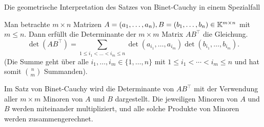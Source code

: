 Die geometrische Interpretation des Satzes von Binet-Cauchy in einem Spezialfall  

\begin{thm}
	Man betrachte $m \times n$ Matrizen $ A = (a_1, \ldots, a_n), B = (b_1, \ldots, b_n) \in \mathbb K^{m \times n} $ mit $ m \leq n $. Dann erfüllt die Determinante der $m \times m$ Matrix $A B^\top$ die Gleichung. 
	\begin{equation}
		\det(AB^\top) = \sum_{1 \leq i_1 < \ldots < i_m \leq n} \det(a_{i_1}, \ldots, a_{i_m}) \det(b_{i_1}, \ldots, b_{i_m}).
	\end{equation}
	(Die Summe geht über alle $i_1,\ldots,i_m \in \{1,\ldots,n\}$ mit $1 \le i_1 < \cdots < i_m \le n$ und hat somit $\binom{n}{m}$ Summanden). 
\end{thm}

Im Satz von Binet-Cauchy wird die Determinante von $A B^\top$ mit der Verwendung aller $m \times m$ Minoren von $A$ und $B$ dargestellt.  Die jeweiligen Minoren von $A$ und $B$ werden miteinander multipliziert, und alle solche Produkte von Minoren werden zusammengerechnet. 


